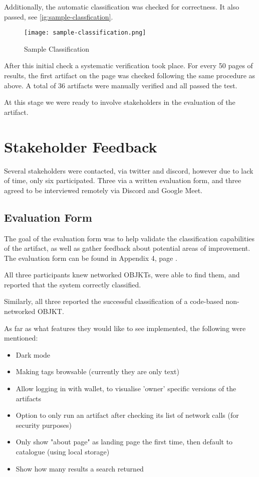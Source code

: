 Additionally, the automatic classification was checked for correctness. It also passed, see \autoref{ig:sample-classfication}.

\begin{figure}[h]
    \centering
    \texttt{[image: sample-classification.png]}
    \caption[Sample Classification]{Sample Classification}
    \label{fig:sample-classfication}
\end{figure}


After this initial check a systematic verification took place. For every 50 pages of results, the first artifact on the page was checked following the same procedure as above. A total of 36 artifacts were manually verified and all passed the test.

At this stage we were ready to involve stakeholders in the evaluation of the artifact.


\section{Stakeholder Feedback}

Several stakeholders were contacted, via twitter and discord, however due to lack of time, only six participated. Three via a written evaluation form, and three agreed to be interviewed remotely via Discord and Google Meet.

\subsection{Evaluation Form}

The goal of the evaluation form was to help validate the classification capabilities of the artifact, as well as gather feedback about potential areas of improvement. The evaluation form can be found in Appendix 4, page \pageref{chap:evalform}.

All three participants knew networked OBJKTs, were able to find them, and reported that the system correctly classified.

Similarly, all three reported the successful classification of a code-based non-networked OBJKT.

As far as what features they would like to see implemented, the following were mentioned:

\begin{itemize}
    \item Dark mode
    \item Making tags browsable (currently they are only text)
    \item Allow logging in with wallet, to visualise 'owner' specific versions of the artifacts
    \item Option to only run an artifact after checking its list of network calls (for security purposes)
    \item Only show "about page" as landing page the first time, then default to catalogue (using local storage)
    \item Show how many results a search returned
\end{itemize}

